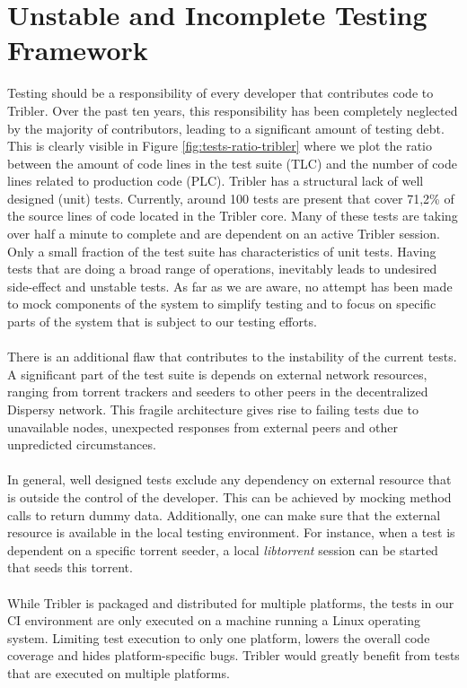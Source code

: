 \section{Unstable and Incomplete Testing Framework}
Testing should be a responsibility of every developer that contributes code to Tribler. Over the past ten years, this responsibility has been completely neglected by the majority of contributors, leading to a significant amount of testing debt. This is clearly visible in Figure \ref{fig:tests-ratio-tribler} where we plot the ratio between the amount of code lines in the test suite (TLC) and the number of code lines related to production code (PLC). Tribler has a structural lack of well designed (unit) tests. Currently, around 100 tests are present that cover 71,2\% of the source lines of code located in the Tribler core. Many of these tests are taking over half a minute to complete and are dependent on an active Tribler session. Only a small fraction of the test suite has characteristics of unit tests. Having tests that are doing a broad range of operations, inevitably leads to undesired side-effect and unstable tests. As far as we are aware, no attempt has been made to mock components of the system to simplify testing and to focus on specific parts of the system that is subject to our testing efforts.\\\\
There is an additional flaw that contributes to the instability of the current tests. A significant part of the test suite is depends on external network resources, ranging from torrent trackers and seeders to other peers in the decentralized Dispersy network. This fragile architecture gives rise to failing tests due to unavailable nodes, unexpected responses from external peers and other unpredicted circumstances.\\\\
In general, well designed tests exclude any dependency on external resource that is outside the control of the developer. This can be achieved by mocking method calls to return dummy data. Additionally, one can make sure that the external resource is available in the local testing environment. For instance, when a test is dependent on a specific torrent seeder, a local \emph{libtorrent} session can be started that seeds this torrent.\\\\
While Tribler is packaged and distributed for multiple platforms, the tests in our CI environment are only executed on a machine running a Linux operating system. Limiting test execution to only one platform, lowers the overall code coverage and hides platform-specific bugs\cite{beller2016oops}. Tribler would greatly benefit from tests that are executed on multiple platforms.

